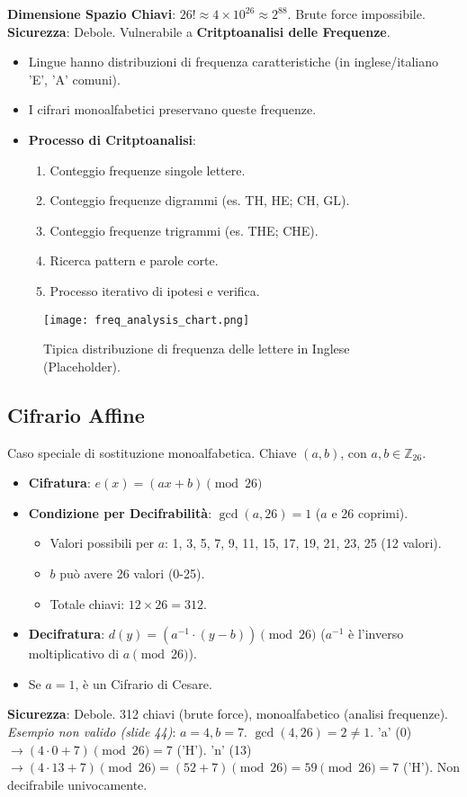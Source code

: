 \documentclass{article}
\begin{document}
\textbf{Dimensione Spazio Chiavi}: $26! \approx 4 \times 10^{26} \approx 2^{88}$. Brute force impossibile.
\textbf{Sicurezza}: Debole. Vulnerabile a \textbf{Critptoanalisi delle Frequenze}.
\begin{itemize}
    \item Lingue hanno distribuzioni di frequenza caratteristiche (in inglese/italiano 'E', 'A' comuni).
    \item I cifrari monoalfabetici preservano queste frequenze.
    \item \textbf{Processo di Critptoanalisi}:
    \begin{enumerate}
        \item Conteggio frequenze singole lettere.
        \item Conteggio frequenze digrammi (es. TH, HE; CH, GL).
        \item Conteggio frequenze trigrammi (es. THE; CHE).
        \item Ricerca pattern e parole corte.
        \item Processo iterativo di ipotesi e verifica.
    \end{enumerate}
\end{itemize}
\begin{figure}[H]
    \centering
    \texttt{[image: freq\_analysis\_chart.png]} %
    \caption{Tipica distribuzione di frequenza delle lettere in Inglese (Placeholder).}
    \label{fig:freq_analysis}
\end{figure}

\subsection{Cifrario Affine}
Caso speciale di sostituzione monoalfabetica. Chiave $(a, b)$, con $a, b \in \mathbb{Z}_{26}$.
\begin{itemize}
    \item \textbf{Cifratura}: $e(x) = (ax + b) \pmod{26}$
    \item \textbf{Condizione per Decifrabilità}: $\gcd(a, 26) = 1$ ($a$ e 26 coprimi).
        \begin{itemize}
            \item Valori possibili per $a$: 1, 3, 5, 7, 9, 11, 15, 17, 19, 21, 23, 25 (12 valori).
            \item $b$ può avere 26 valori (0-25).
            \item Totale chiavi: $12 \times 26 = 312$.
        \end{itemize}
    \item \textbf{Decifratura}: $d(y) = (a^{-1} \cdot (y - b)) \pmod{26}$ ($a^{-1}$ è l'inverso moltiplicativo di $a \pmod{26}$).
    \item Se $a=1$, è un Cifrario di Cesare.
\end{itemize}
\textbf{Sicurezza}: Debole. 312 chiavi (brute force), monoalfabetico (analisi frequenze).
\textit{Esempio non valido (slide 44)}: $a=4, b=7$. $\gcd(4, 26)=2 \neq 1$.
'a' (0) $\rightarrow (4 \cdot 0 + 7) \pmod{26} = 7$ ('H').
'n' (13) $\rightarrow (4 \cdot 13 + 7) \pmod{26} = (52+7) \pmod{26} = 59 \pmod{26} = 7$ ('H').
Non decifrabile univocamente.
\end{document}
